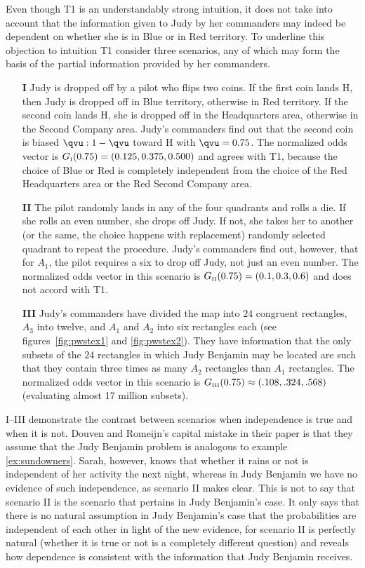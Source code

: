 \documentclass[phd,12pt,oneside]{ubcthesis}
\begin{document}
Even though T1 is an understandably strong intuition, it does
not take into account that the information given to Judy by her
commanders may indeed be dependent on whether she is in Blue or in Red
territory. To underline this objection to intuition T1 consider three
scenarios, any of which may form the basis of the partial information
provided by her commanders.

\begin{enumerate}
\item[\textbf{I}] Judy is dropped off by a pilot who flips two
  coins. If the first coin lands H, then Judy is dropped off in Blue
  territory, otherwise in Red territory. If the second coin lands H,
  she is dropped off in the Headquarters area, otherwise in the
  Second Company area. Judy's commanders find out that the second coin
  is biased ${\qvu}:1-{\qvu}$ toward H with ${\qvu}=0.75$. The normalized odds
  vector is $G_{\mbox{\tiny I}}(0.75)=(0.125,0.375,0.500)$ and agrees
  with T1, because the choice of Blue or Red is completely independent
  from the choice of the Red Headquarters area or the Red Second
  Company area.
\item[\textbf{II}] The pilot randomly lands in any of the four
  quadrants and rolls a die. If she rolls an even number, she drops
  off Judy. If not, she takes her to another (or the same, the choice
  happens with replacement) randomly selected quadrant to repeat the
  procedure. Judy's commanders find out, however, that for $A_{1}$,
  the pilot requires a six to drop off Judy, not just an even number.
  The normalized odds vector in this scenario is $G_{\mbox{\tiny
      II}}(0.75)=(0.1,0.3,0.6)$ and does not accord with T1.
\item[\textbf{III}] Judy's commanders have divided the map into $24$
  congruent rectangles, $A_{3}$ into twelve, and $A_{1}$ and $A_{2}$
  into six rectangles each (see figures~\ref{fig:pwstex1} and
  \ref{fig:pwstex2}). They have information that the only subsets of
  the $24$ rectangles in which Judy Benjamin may be located are such
  that they contain three times as many $A_{2}$ rectangles than
  $A_{1}$ rectangles. The normalized odds vector in this scenario is
  $G_{\mbox{\tiny III}}(0.75)\approx(.108,.324,.568)$ (evaluating almost
  17 million subsets).
\end{enumerate}

I--III demonstrate the contrast between scenarios when independence is
true and when it is not. Douven and Romeijn's capital mistake in their
paper is that they assume that the Judy Benjamin problem is analogous
to example \ref{ex:sundowners}. Sarah, however, knows that whether it
rains or not is independent of her activity the next night, whereas in
Judy Benjamin we have no evidence of such independence, as scenario II
makes clear. This is not to say that scenario II is the scenario that
pertains in Judy Benjamin's case. It only says that there is no
natural assumption in Judy Benjamin's case that the probabilities are
independent of each other in light of the new evidence, for scenario
II is perfectly natural (whether it is true or not is a completely
different question) and reveals how dependence is consistent with the
information that Judy Benjamin receives.
\end{document}
